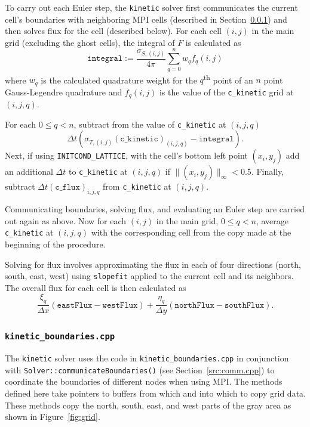\documentclass{article}
\newcommand{\assign}{\ensuremath{\mathrel{\texttt{:=}}}}
\newcommand{\kinetic}{\texttt{kinetic}\xspace}
\begin{document}
To carry out each Euler step, the \kinetic solver first communicates the current cell's
boundaries with neighboring MPI cells (described in
Section~\ref{src:kinetic_boundaries.cpp}) and then solves flux for the
cell (described below). For each cell $(i,j)$ in the main grid (excluding the ghost
cells), the integral of $F$ is calculated as
\begin{equation}
    \texttt{integral} \assign
    \frac{\sigma_{S,(i,j)}}{4\pi} \sum_{q=0}^n w_q f_q(i,j)
\end{equation}
where $w_q$ is the calculated quadrature weight for the $q$\textsuperscript{th} point
of an $n$ point Gauss-Legendre quadrature and
$f_q(i,j)$ is the value of the \texttt{c\_kinetic} grid at $(i,j,q)$.

For each $0 \leq q < n$, subtract from the value of \texttt{c\_kinetic} at $(i,j,q)$
\begin{equation} %
    \Delta t \left(\sigma_{T,(i,j)} (\mathtt{c\_kinetic})_{(i,j,q)} -
    \mathtt{integral}\right).
\end{equation}
Next, if using \texttt{INITCOND\_LATTICE}, with the cell's bottom left point
$(x_i,y_j)$ add an additional $\Delta t$ to \texttt{c\_kinetic} at $(i,j,q)$ if
$\|(x_i,y_j)\|_\infty < 0.5$. Finally, subtract $\Delta t (\mathtt{c\_flux})_{i,j,q}$
from \texttt{c\_kinetic} at $(i,j,q)$.

Communicating boundaries, solving flux, and evaluating an Euler step are carried out
again as above. Now for each $(i,j)$ in the main grid, $0 \leq q < n$, average
\texttt{c\_kinetic} at $(i,j,q)$ with the corresponding cell from the copy made at
the beginning of the procedure.

Solving for flux involves approximating the flux in each of four directions
(north, south, east, west) using
\texttt{slopefit} applied to the current cell and its neighbors. The overall flux for
each cell is then calculated as
\begin{equation}
    \frac{\xi_q}{\Delta x} (\mathtt{eastFlux} - \mathtt{westFlux}) +
    \frac{\eta_q}{\Delta y} (\mathtt{northFlux} - \mathtt{southFlux}).
\end{equation}

\subsubsection{\texttt{kinetic\_boundaries.cpp}}
\label{src:kinetic_boundaries.cpp}
The \kinetic solver uses the code in \texttt{kinetic\_boundaries.cpp} in
conjunction with \texttt{Solver::communicateBoundaries()}
(see Section~\ref{src:comm.cpp}) to coordinate the boundaries of different nodes
when using MPI.
The methods defined here take pointers to buffers from which and into which to copy
grid data. These methods copy the north, south, east, and west parts of the gray
area as shown in Figure~\ref{fig:grid}.
\end{document}
